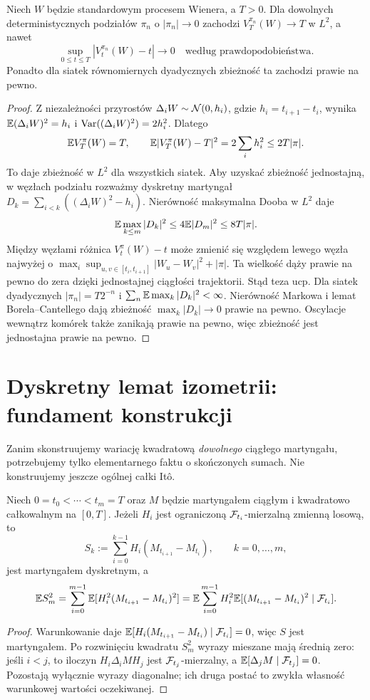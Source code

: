 \begin{twierdzenie}
\label{thm:brownian-bracket}
Niech $W$ będzie standardowym procesem Wienera,
a $T>0$. Dla dowolnych deterministycznych podziałów
$\pi_n$ o $|\pi_n|\to0$ zachodzi
$V_T^{\pi_n}(W)\to T$ w $L^2$, a nawet
\[
\sup_{0\le t\le T}|V_t^{\pi_n}(W)-t|
\longrightarrow0
\quad\text{według prawdopodobieństwa}.
\]
Ponadto dla siatek równomiernych dyadycznych
zbieżność ta zachodzi prawie na pewno.
\end{twierdzenie}
\begin{proof}
Z niezależności przyrostów $\Delta_iW\sim
\mathcal{N}(0,h_i)$, gdzie $h_i=t_{i+1}-t_i$,
wynika $\mathbb{E}(\Delta_iW)^2=h_i$ i
$\operatorname{Var}((\Delta_iW)^2)=2h_i^2$.
Dlatego
\[
\mathbb{E} V_T^\pi(W)=T,\qquad
\mathbb{E}|V_T^\pi(W)-T|^2=2\sum_i h_i^2
\le2T|\pi|.
\]
To daje zbieżność w $L^2$ dla wszystkich siatek.
Aby uzyskać zbieżność jednostajną, w węzłach podziału
rozważmy dyskretny martyngał
$D_k=\sum_{i<k}((\Delta_iW)^2-h_i)$.
Nierówność maksymalna Dooba w $L^2$ daje
\[
\mathbb{E}\max_{k\le m}|D_k|^2\le4\mathbb{E}|D_m|^2
\le8T|\pi|.
\]
Między węzłami różnica $V_t^\pi(W)-t$ może
zmienić się względem lewego węzła najwyżej o
$\max_i\sup_{u,v\in[t_i,t_{i+1}]}|W_u-W_v|^2+|\pi|$.
Ta wielkość dąży prawie na pewno do zera dzięki
jednostajnej ciągłości trajektorii. Stąd teza ucp.
Dla siatek dyadycznych $|\pi_n|=T2^{-n}$
i $\sum_n\mathbb{E}\max_k|D_k|^2<\infty$.
Nierówność Markowa i lemat Borela--Cantellego dają
zbieżność $\max_k|D_k|\to0$ prawie na pewno.
Oscylacje wewnątrz komórek także zanikają prawie na pewno,
więc zbieżność jest jednostajna prawie na pewno.
\end{proof}

\section{Dyskretny lemat izometrii: fundament konstrukcji}
Zanim skonstruujemy wariację kwadratową \emph{dowolnego}
ciągłego martyngału, potrzebujemy tylko elementarnego
faktu o skończonych sumach. Nie konstruujemy jeszcze
ogólnej całki Itô.

\begin{lemat}
\label{lem:discrete-isometry}
Niech $0=t_0<\cdots<t_m=T$ oraz
$M$ będzie martyngałem ciągłym i kwadratowo całkowalnym
na $[0,T]$. Jeżeli $H_i$ jest ograniczoną
$\mathcal{F}_{t_i}$-mierzalną zmienną losową, to
\[
S_k:=\sum_{i=0}^{k-1}H_i(M_{t_{i+1}}-M_{t_i}),
\qquad k=0,\ldots,m,
\]
jest martyngałem dyskretnym, a
\[
\mathbb{E} S_m^2
=\sum_{i=0}^{m-1}\mathbb{E}[H_i^2(M_{t_{i+1}}-M_{t_i})^2]
=\mathbb{E}\sum_{i=0}^{m-1}H_i^2
\mathbb{E}[(M_{t_{i+1}}-M_{t_i})^2\mid\mathcal{F}_{t_i}].
\]
\end{lemat}
\begin{proof}
Warunkowanie daje
$\mathbb{E}[H_i(M_{t_{i+1}}-M_{t_i})\mid\mathcal{F}_{t_i}]=0$,
więc $S$ jest martyngałem. Po rozwinięciu kwadratu
$S_m^2$ wyrazy mieszane mają średnią zero:
jeśli $i<j$, to iloczyn
$H_i\Delta_iM H_j$ jest $\mathcal{F}_{t_j}$-mierzalny,
a $\mathbb{E}[\Delta_jM\mid\mathcal{F}_{t_j}]=0$.
Pozostają wyłącznie wyrazy diagonalne; ich druga
postać to zwykła własność warunkowej wartości oczekiwanej.
\end{proof}

